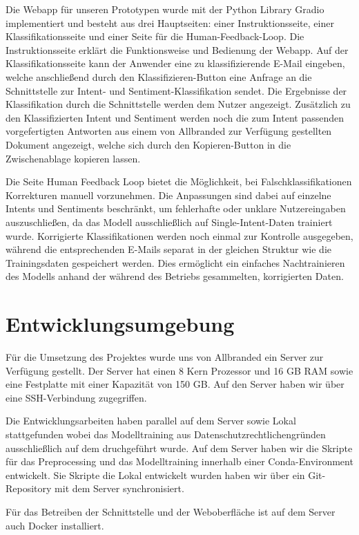 Die Webapp für unseren Prototypen wurde mit der Python Library Gradio implementiert und besteht
aus drei Hauptseiten: einer Instruktionsseite, einer Klassifikationsseite und einer Seite für
die Human-Feedback-Loop. Die Instruktionsseite erklärt die Funktionsweise und Bedienung
der Webapp. Auf der Klassifikationsseite kann der Anwender eine zu klassifizierende E-Mail
eingeben, welche anschließend durch den Klassifizieren-Button eine Anfrage an die Schnittstelle
zur Intent- und Sentiment-Klassifikation sendet. Die Ergebnisse der Klassifikation durch die
Schnittstelle werden dem Nutzer angezeigt. Zusätzlich zu den Klassifizierten Intent und Sentiment
werden noch die zum Intent passenden vorgefertigten Antworten aus einem von Allbranded zur
Verfügung gestellten Dokument angezeigt, welche sich durch den Kopieren-Button in die
Zwischenablage kopieren lassen.  

Die Seite Human Feedback Loop bietet die Möglichkeit, bei Falschklassifikationen Korrekturen
manuell vorzunehmen. Die Anpassungen sind dabei auf einzelne Intents und Sentiments beschränkt,
um fehlerhafte oder unklare Nutzereingaben auszuschließen, da das Modell ausschließlich auf
Single-Intent-Daten trainiert wurde. Korrigierte Klassifikationen werden noch einmal zur
Kontrolle ausgegeben, während die entsprechenden E-Mails separat in der gleichen Struktur
wie die Trainingsdaten gespeichert werden. Dies ermöglicht ein einfaches Nachtrainieren des
Modells anhand der während des Betriebs gesammelten, korrigierten Daten. 

\section{Entwicklungsumgebung}

Für die Umsetzung des Projektes wurde uns von Allbranded ein Server zur Verfügung gestellt.
Der Server hat einen 8 Kern Prozessor und 16 GB RAM sowie eine Festplatte mit einer Kapazität von 150 GB.
Auf den Server haben wir über eine SSH-Verbindung zugegriffen.  

Die Entwicklungsarbeiten haben parallel auf dem Server sowie Lokal stattgefunden wobei das Modelltraining
aus Datenschutzrechtlichengründen ausschließlich auf dem druchgeführt wurde. Auf dem Server haben wir die
Skripte für das Preprocessing und das Modelltraining innerhalb einer Conda-Environment entwickelt. Sie
Skripte die Lokal entwickelt wurden haben wir über ein Git-Repository mit dem Server synchronisiert.  

Für das Betreiben der Schnittstelle und der Weboberfläche ist auf dem Server auch Docker installiert.